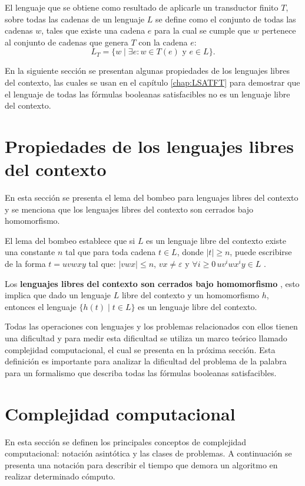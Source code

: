 \documentclass[12pt]{article}
\begin{document}
El lenguaje que se obtiene como resultado de aplicarle un transductor finito $T$, sobre todas las cadenas de un lenguaje $L$ se define como
el conjunto de todas las cadenas $w$, tales que existe una cadena $e$ para la cual se cumple que $w$ pertenece al conjunto de cadenas
que genera $T$ con la cadena $e$:
$$L_T=\{w\mid \exists e: w\in T(e) \text{ y }e\in L\}.$$

En la siguiente sección se presentan algunas propiedades de los lenguajes libres del contexto, 
las cuales se usan en el capítulo \ref{chap:LSATFT} para demostrar que el lenguaje 
de todas las fórmulas booleanas satisfacibles no es un lenguaje
libre del contexto.

\section{Propiedades de los lenguajes libres del contexto}

En esta sección se presenta el lema del bombeo para lenguajes libres del contexto y se menciona que los lenguajes 
libres del contexto son cerrados bajo homomorfismo.

El lema del bombeo establece que si $L$ es un lenguaje libre del contexto
existe una constante $n$ tal que para toda cadena $t\in L$, donde $|t|\geq n$, puede escribirse de la forma $t=uvwxy$ tal que:
$|vwx|\leq n$, $vx\neq \varepsilon$ y $\forall i\geq 0\,uv^iwx^iy\in L$ \cite{authomataTheory}.

Los \textbf{lenguajes libres del contexto son cerrados bajo homomorfismo} \cite{authomataTheory}, esto
implica que dado un lenguaje $L$ libre del contexto y un homomorfismo $h$, entonces el lenguaje
$\{h(t)\mid t\in L\}$ es un lenguaje libre del contexto.


Todas las operaciones con lenguajes y los problemas relacionados con ellos tienen una dificultad y para medir esta dificultad
se utiliza un marco teórico llamado complejidad computacional, el cual se presenta en la próxima sección. Esta definición
es importante para analizar la dificultad del problema de la palabra para un formalismo que describa todas las fórmulas booleanas
satisfacibles.

\section{Complejidad computacional}

En esta sección se definen los principales conceptos de complejidad computacional: notación asintótica y las clases de problemas. A continuación se presenta una notación para describir el tiempo que demora un algoritmo en realizar determinado cómputo.
\end{document}
